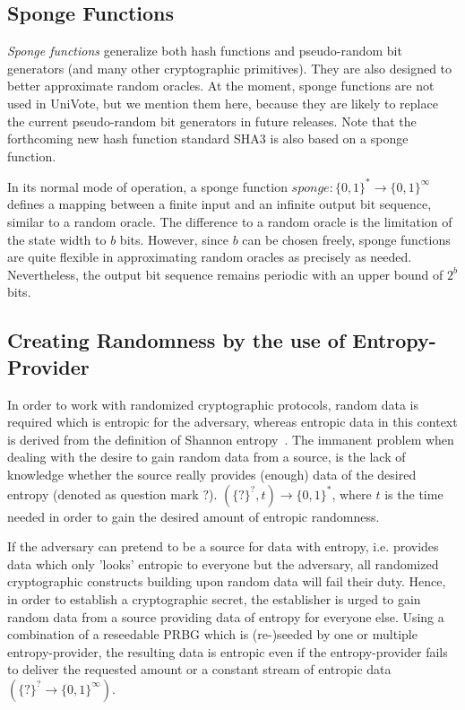 \documentclass[bibtotoc,halfparskip,oneside]{scrreprt}
\begin{document}
\subsection{Sponge Functions}

\emph{Sponge functions} generalize both hash functions and pseudo-random bit generators (and many other cryptographic primitives). They are also designed to better approximate random oracles. At the moment, sponge functions are not used in UniVote, but we mention them here, because they are likely to replace the current pseudo-random bit generators in future releases. Note that the forthcoming new hash function standard SHA3 is also based on a sponge function.

In its normal mode of operation, a sponge function $\mathit{sponge}:\{0,1\}^*\rightarrow\{0,1\}^\infty$ defines a mapping between a finite input and an infinite output bit sequence, similar to a random oracle. The difference to a random oracle is the limitation of the state width to $b$ bits. However, since $b$ can be chosen freely, sponge functions are quite flexible in approximating random oracles as precisely as needed. Nevertheless, the output bit sequence remains periodic with an upper bound of $2^b$ bits.



\subsection{Creating Randomness by the use of Entropy-Provider}
In order to work with randomized cryptographic protocols, random data is required which is entropic for the adversary, whereas entropic data in this context is derived from the definition of Shannon entropy~\cite{shannon48}. The immanent problem when dealing with the desire to gain random data from a source, is the lack of knowledge whether the source really provides (enough) data of the desired entropy (denoted as question mark $?$). $(\{?\}^?,t) \rightarrow \{0,1\}^*$, where $t$ is the time needed in order to gain the desired amount of entropic randomness.

If the adversary can pretend to be a source for data with entropy, i.e. provides data which only 'looks' entropic to everyone but the adversary, all randomized cryptographic constructs building upon random data will fail their duty. Hence, in order to establish a cryptographic secret, the establisher is urged to gain random data from a source providing data of entropy for everyone else. Using a combination of a reseedable PRBG which is (re-)seeded by one or multiple entropy-provider, the resulting data is entropic even if the entropy-provider fails to deliver the requested amount or a constant stream of entropic data $(\{?\}^?\rightarrow\{0,1\}^\infty)$.
\end{document}
